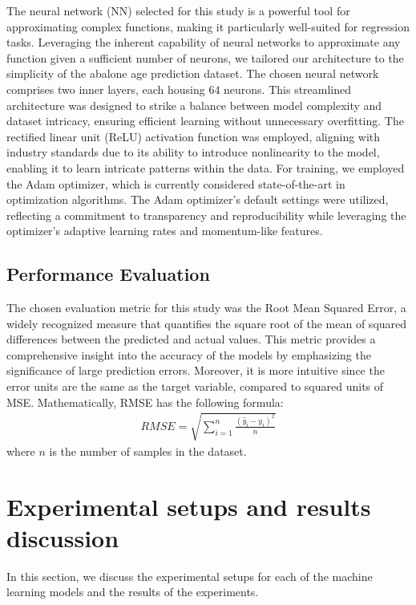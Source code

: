 \documentclass[12pt]{article}
\begin{document}
The neural network (NN) selected for this study is a powerful tool for approximating complex functions, making it particularly well-suited for regression tasks. Leveraging the inherent capability of neural networks to approximate any function given a sufficient number of neurons, we tailored our architecture to the simplicity of the abalone age prediction dataset. The chosen neural network comprises two inner layers, each housing 64 neurons. This streamlined architecture was designed to strike a balance between model complexity and dataset intricacy, ensuring efficient learning without unnecessary overfitting. The rectified linear unit (ReLU) activation function was employed, aligning with industry standards due to its ability to introduce nonlinearity to the model, enabling it to learn intricate patterns within the data. For training, we employed the Adam optimizer, which is currently considered state-of-the-art in optimization algorithms. The Adam optimizer's default settings were utilized, reflecting a commitment to transparency and reproducibility while leveraging the optimizer's adaptive learning rates and momentum-like features.

\subsection{Performance Evaluation}

The chosen evaluation metric for this study was the Root Mean Squared Error, a widely recognized measure that quantifies the square root of the mean of squared differences between the predicted and actual values. This metric provides a comprehensive insight into the accuracy of the models by emphasizing the significance of large prediction errors. Moreover, it is more intuitive since the error units are the same as the target variable, compared to squared units of MSE. Mathematically, RMSE has the following formula:
\begin{gather*}
	RMSE = \sqrt{\sum_{i = 1}^n \frac{(\hat{y}_i - y_i)^2}{n}}
\end{gather*}
where $n$ is the number of samples in the dataset.

\section{Experimental setups and results discussion}

In this section, we discuss the experimental setups for each of the machine learning models and the results of the experiments.
\end{document}
